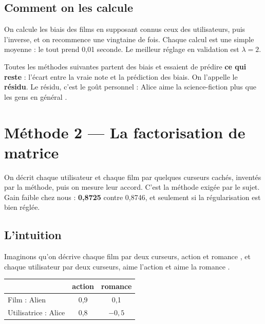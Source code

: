 \documentclass[11pt,a4paper]{article}
\begin{document}
\subsection{Comment on les calcule}

On calcule les biais des films en supposant connus ceux des utilisateurs, puis l'inverse,
et on recommence une vingtaine de fois. Chaque calcul est une simple moyenne : le tout
prend 0,01 seconde. Le meilleur réglage en validation est $\lambda = 2$.

\begin{retenir}
Toutes les méthodes suivantes partent des biais et essaient de prédire \textbf{ce qui
reste} : l'écart entre la vraie note et la prédiction des biais. On l'appelle le
\textbf{résidu}. Le résidu, c'est le goût personnel : \og Alice aime la science-fiction
plus que les gens en général \fg.
\end{retenir}

\section{Méthode 2 --- La factorisation de matrice}\label{sec:mf}

\begin{enbref}
On décrit chaque utilisateur et chaque film par quelques \og curseurs \fg cachés,
inventés par la méthode, puis on mesure leur accord. C'est la méthode exigée par le
sujet. Gain faible chez nous : \textbf{0,8725} contre 0,8746, et seulement si la
régularisation est bien réglée.
\end{enbref}

\subsection{L'intuition}

Imaginons qu'on décrive chaque film par deux curseurs, \og action \fg et \og romance \fg,
et chaque utilisateur par deux curseurs, \og aime l'action \fg et \og aime la romance \fg.

\begin{center}
\begin{tabular}{lcc}
\toprule
 & action & romance \\
\midrule
Film : Alien & 0,9 & 0,1 \\
Utilisatrice : Alice & 0,8 & $-0{,}5$ \\
\bottomrule
\end{tabular}
\end{center}
\end{document}

